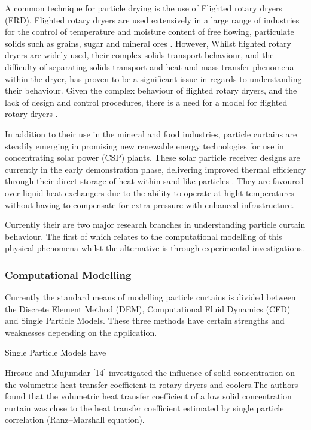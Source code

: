 \documentclass[12pt]{article}
\newcommand{\ts}{\textsuperscript}
\newcommand{\pe}{\vspace{0.3cm}}
\newcommand{\mycite}[1]{\ts{\cite{#1}}}
\begin{document}
\pe 

A common technique for particle drying is the use of Flighted rotary dryers (FRD). Flighted rotary dryers are used extensively in a large range of industries for the control of
temperature and moisture content of free flowing, particulate solids such as grains, sugar and mineral ores \mycite{AndrewLeePhd}. However, Whilst flighted rotary dryers are widely used, their complex solids transport behaviour, and the difficulty of separating solids transport and heat and mass transfer phenomena within the dryer, has proven to be a significant issue in regards to understanding their behaviour. Given the complex behaviour of flighted rotary dryers, and the lack of design and control procedures, there is a need for a model for flighted rotary dryers \mycite{AndrewLeePhd}. 

\pe 

In addition to their use in the mineral and food industries, particle curtains are steadily emerging in promising new renewable energy technologies for use in concentrating solar power (CSP) plants. These solar particle receiver designs are currently in the early demonstration phase, delivering improved thermal efficiency through their direct storage of heat within sand-like particles \ts{\cite{christian2015system, viebahn2011potential}}. They are favoured over liquid heat exchangers due to the ability to operate at hight temperatures without having to compensate for extra pressure with enhanced infrastructure. 

\pe 

Currently their are two major research branches in understanding particle curtain behaviour. The first of which relates to the computational modelling of this physical phenomena whilst the alternative is through experimental investigations.  

\subsubsection{Computational Modelling} 

Currently the standard means of modelling particle curtains is divided between the Discrete Element Method (DEM), Computational Fluid Dynamics (CFD) and Single Particle Models. These three methods have certain strengths and weaknesses depending on the application. 

\pe 

Single Particle Models have 

Hirosue and Mujumdar [14] investigated the influence of solid
concentration on the volumetric heat transfer coefficient in rotary
dryers and coolers.The authors found that the volumetric heat
transfer coefficient of a low solid concentration curtain was close to
the heat transfer coefficient estimated by single particle correlation
(Ranz–Marshall equation).
\end{document}
